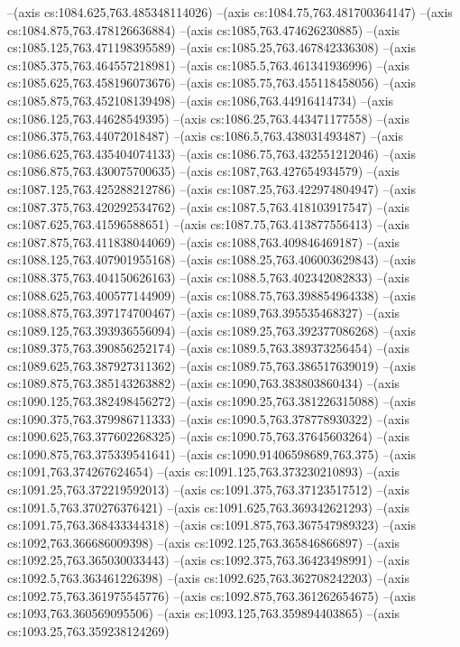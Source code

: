 --(axis cs:1084.625,763.485348114026)
--(axis cs:1084.75,763.481700364147)
--(axis cs:1084.875,763.478126636884)
--(axis cs:1085,763.474626230885)
--(axis cs:1085.125,763.471198395589)
--(axis cs:1085.25,763.467842336308)
--(axis cs:1085.375,763.464557218981)
--(axis cs:1085.5,763.461341936996)
--(axis cs:1085.625,763.458196073676)
--(axis cs:1085.75,763.455118458056)
--(axis cs:1085.875,763.452108139498)
--(axis cs:1086,763.44916414734)
--(axis cs:1086.125,763.44628549395)
--(axis cs:1086.25,763.443471177558)
--(axis cs:1086.375,763.44072018487)
--(axis cs:1086.5,763.438031493487)
--(axis cs:1086.625,763.435404074133)
--(axis cs:1086.75,763.432551212046)
--(axis cs:1086.875,763.430075700635)
--(axis cs:1087,763.427654934579)
--(axis cs:1087.125,763.425288212786)
--(axis cs:1087.25,763.422974804947)
--(axis cs:1087.375,763.420292534762)
--(axis cs:1087.5,763.418103917547)
--(axis cs:1087.625,763.41596588651)
--(axis cs:1087.75,763.413877556413)
--(axis cs:1087.875,763.411838044069)
--(axis cs:1088,763.409846469187)
--(axis cs:1088.125,763.407901955168)
--(axis cs:1088.25,763.406003629843)
--(axis cs:1088.375,763.404150626163)
--(axis cs:1088.5,763.402342082833)
--(axis cs:1088.625,763.400577144909)
--(axis cs:1088.75,763.398854964338)
--(axis cs:1088.875,763.397174700467)
--(axis cs:1089,763.395535468327)
--(axis cs:1089.125,763.393936556094)
--(axis cs:1089.25,763.392377086268)
--(axis cs:1089.375,763.390856252174)
--(axis cs:1089.5,763.389373256454)
--(axis cs:1089.625,763.387927311362)
--(axis cs:1089.75,763.386517639019)
--(axis cs:1089.875,763.385143263882)
--(axis cs:1090,763.383803860434)
--(axis cs:1090.125,763.382498456272)
--(axis cs:1090.25,763.381226315088)
--(axis cs:1090.375,763.379986711333)
--(axis cs:1090.5,763.378778930322)
--(axis cs:1090.625,763.377602268325)
--(axis cs:1090.75,763.37645603264)
--(axis cs:1090.875,763.375339541641)
--(axis cs:1090.91406598689,763.375)
--(axis cs:1091,763.374267624654)
--(axis cs:1091.125,763.373230210893)
--(axis cs:1091.25,763.372219592013)
--(axis cs:1091.375,763.37123517512)
--(axis cs:1091.5,763.370276376421)
--(axis cs:1091.625,763.369342621293)
--(axis cs:1091.75,763.368433344318)
--(axis cs:1091.875,763.367547989323)
--(axis cs:1092,763.366686009398)
--(axis cs:1092.125,763.365846866897)
--(axis cs:1092.25,763.365030033443)
--(axis cs:1092.375,763.36423498991)
--(axis cs:1092.5,763.363461226398)
--(axis cs:1092.625,763.362708242203)
--(axis cs:1092.75,763.361975545776)
--(axis cs:1092.875,763.361262654675)
--(axis cs:1093,763.360569095506)
--(axis cs:1093.125,763.359894403865)
--(axis cs:1093.25,763.359238124269)
